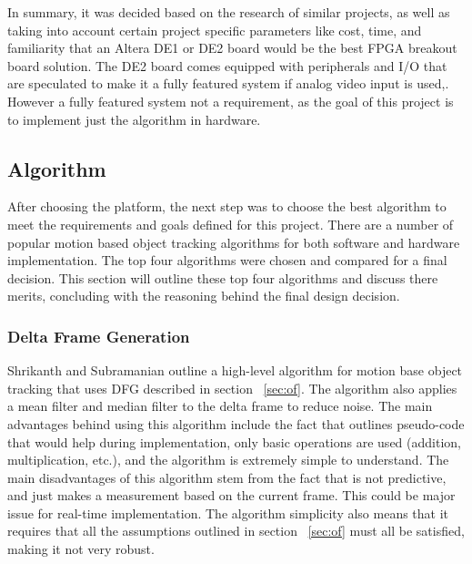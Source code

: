 \documentclass[12pt]{article} %
\begin{document}
In summary, it was decided based on the research of similar projects, as well as taking into account certain project specific parameters like cost, time, and familiarity that an Altera DE1 or DE2 board would be the best FPGA breakout board solution. The DE2 board comes equipped with peripherals and I/O that are speculated to make it a fully featured system if analog video input is used,. However a fully featured system not a requirement, as the goal of this project is to implement just the algorithm in hardware.
\subsection{Algorithm}
\label{sec:algorithm}
After choosing the platform, the next step was to choose the best algorithm to meet the requirements and goals defined for this project. There are a number of popular motion based object tracking algorithms for both software and hardware implementation. The top four algorithms were chosen and compared for a final decision. This section will outline these top four algorithms and discuss there merits, concluding with the reasoning behind the final design decision.
\subsubsection{Delta Frame Generation}
Shrikanth and Subramanian \cite{8} outline a high-level algorithm for motion base object tracking that uses DFG described in section ~\ref{sec:of}. The algorithm also applies a mean filter and median filter to the delta frame to reduce noise. The main advantages behind using this algorithm include the fact that \cite{8} outlines pseudo-code that would help during implementation, only basic operations are used (addition, multiplication, etc.), and the algorithm is extremely simple to understand. The main disadvantages of this algorithm stem from the fact that is not predictive, and just makes a measurement based on the current frame. This could be major issue for real-time implementation. The algorithm simplicity also means that it requires that all the assumptions outlined in section ~\ref{sec:of} must all be satisfied, making it not very robust.
\end{document}

